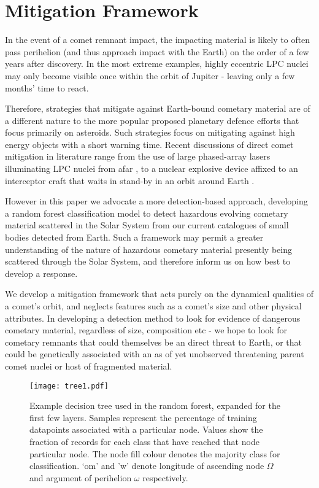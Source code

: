 \chapter{Mitigation Framework}
\label{chap:mitigation}

In the event of a comet remnant impact, the impacting material is likely to often pass perihelion (and thus approach impact with the Earth) on the order of a few years after discovery. In the most extreme examples, highly eccentric LPC nuclei may only become visible once within the orbit of Jupiter - leaving only a few months' time to react. 

Therefore, strategies that mitigate against Earth-bound cometary material are of a different nature to the more popular proposed planetary defence efforts that focus primarily on asteroids. Such strategies focus on mitigating against high energy objects with a short warning time. Recent discussions of direct comet mitigation in literature range from the use of large phased-array lasers illuminating LPC nuclei from afar \citep{2016PASP..128d5001Z}, to a nuclear explosive device affixed to an interceptor craft that waits in stand-by in an orbit around Earth \citep{7500925, HUSSEIN2016488}. %

However in this paper we advocate a more detection-based approach, developing a random forest classification model to detect hazardous evolving cometary material scattered in the Solar System from our current catalogues of small bodies detected from Earth. Such a framework may permit a greater understanding of the nature of hazardous cometary material presently being scattered through the Solar System, and therefore inform us on how best to develop a response.

We develop a mitigation framework that acts purely on the dynamical qualities of a comet's orbit, and neglects features such as a comet's size and other physical attributes. In developing a detection method to look for evidence of dangerous cometary material, regardless of size, composition etc - we hope to look for cometary remnants that could themselves be an direct threat to Earth, or that could be genetically associated with an as of yet unobserved threatening parent comet nuclei or host of fragmented material.

\begin{figure}[t!]
    \centering
    \texttt{[image: tree1.pdf]}
    \caption[Example decision tree]{Example decision tree used in the random forest, expanded for the first few layers. Samples represent the percentage of training datapoints associated with a particular node. Values show the fraction of records for each class that have reached that node particular node. The node fill colour denotes the majority class for classification. `om' and 'w' denote longitude of ascending node $\Omega$ and argument of perihelion $\omega$ respectively.}
    \label{fig:tree}
\end{figure}

